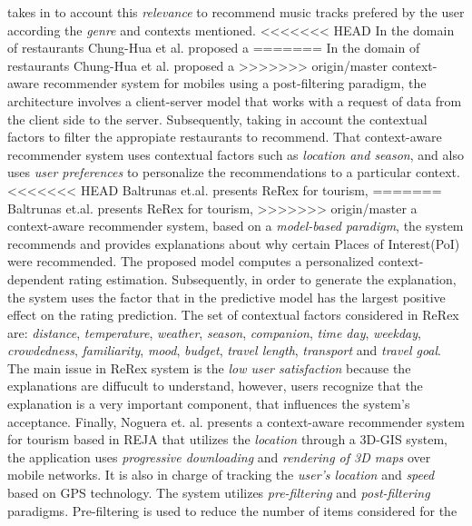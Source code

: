 takes in to account this \textit{relevance} to recommend music tracks 
prefered by the user according the \textit{genre} and contexts mentioned.
<<<<<<< HEAD
In the domain of restaurants Chung-Hua et al. \cite{chu2013chinese} proposed a
=======
In the domain of restaurants Chung-Hua et al.\cite{chu2013chinese} proposed a
>>>>>>> origin/master
context-aware recommender system for mobiles using a post-filtering
paradigm, the architecture involves a  client-server model that works
with a request of data from the client side to the server.
Subsequently, taking in account the contextual factors to filter the
appropiate restaurants to recommend. That context-aware recommender
system uses contextual factors such as \textit{location and season}, and
also uses \textit{user preferences} to personalize the recommendations
to a particular context.
<<<<<<< HEAD
Baltrunas et.al. \cite{baltrunas2011context} presents ReRex for tourism, 
=======
Baltrunas et.al.\cite{baltrunas2011context} presents ReRex for tourism, 
>>>>>>> origin/master
a context-aware recommender system, based on a 
\textit{model-based paradigm}, the system recommends and provides 
explanations about why certain Places of Interest(PoI) were recommended. 
The proposed model computes a 
personalized context-dependent rating estimation. Subsequently, in
order to generate the explanation, the system uses
the factor that in the predictive model has the largest positive
effect on the rating prediction. The set of
contextual factors considered in ReRex are: \textit{distance},
\textit{temperature}, \textit{weather}, \textit{season}, \textit{companion}, 
\textit{time day}, \textit{weekday}, \textit{crowdedness}, \textit{familiarity}, 
\textit{mood}, \textit{budget}, \textit{travel length}, \textit{transport} and
\textit{travel goal}. The main issue in ReRex system is the \textit{low user
satisfaction} because the explanations are diffucult to understand,
however, users recognize that the explanation is a very important
component, that influences the system's acceptance. 
Finally, Noguera et. al. \cite{noguera2012mobile} presents a context-aware
recommender system for tourism based in REJA that utilizes the 
\textit{location} through a 3D-GIS system, the application uses 
\textit{progressive downloading} and \textit{rendering of
3D maps} over mobile networks. It is also in charge of tracking the
\textit{user's location} and \textit{speed} based on GPS technology. 
The system utilizes \textit{pre-filtering} and \textit{post-filtering} paradigms. 
Pre-filtering is used to reduce the number of items considered for the

